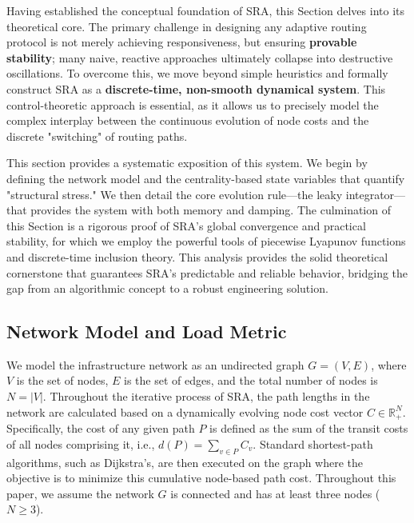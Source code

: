 \documentclass[journal]{IEEEtran}
\begin{document}
Having established the conceptual foundation of SRA, this Section delves into its theoretical core. The primary challenge in designing any adaptive routing protocol is not merely achieving responsiveness, but ensuring \textbf{provable stability}; many naive, reactive approaches ultimately collapse into destructive oscillations. To overcome this, we move beyond simple heuristics and formally construct SRA as a \textbf{discrete-time, non-smooth dynamical system}. This control-theoretic approach is essential, as it allows us to precisely model the complex interplay between the continuous evolution of node costs and the discrete "switching" of routing paths.

This section provides a systematic exposition of this system. We begin by defining the network model and the centrality-based state variables that quantify "structural stress." We then detail the core evolution rule—the leaky integrator—that provides the system with both memory and damping. The culmination of this Section is a rigorous proof of SRA's global convergence and practical stability, for which we employ the powerful tools of piecewise Lyapunov functions and discrete-time inclusion theory. This analysis provides the solid theoretical cornerstone that guarantees SRA's predictable and reliable behavior, bridging the gap from an algorithmic concept to a robust engineering solution.

\subsection{Network Model and Load Metric}

We model the infrastructure network as an undirected graph $G=(V,E)$, where $V$ is the set of nodes, $E$ is the set of edges, and the total number of nodes is $N=|V|$. Throughout the iterative process of SRA, the path lengths in the network are calculated based on a dynamically evolving node cost vector $C \in \mathbb{R}^N_+$. Specifically, the cost of any given path $P$ is defined as the sum of the transit costs of all nodes comprising it, i.e., $d(P) = \sum_{v \in P} C_v$. Standard shortest-path algorithms, such as Dijkstra's, are then executed on the graph where the objective is to minimize this cumulative node-based path cost.
Throughout this paper, we assume the network $G$ is connected and has at least three nodes ($N \ge 3$).
\end{document}
